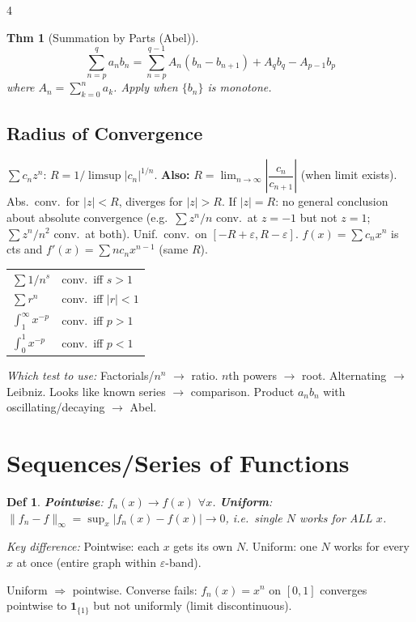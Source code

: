 \documentclass[9pt,landscape]{extarticle}
\newcommand{\eps}{\varepsilon}
\theoremstyle{compact}
\newtheorem*{thm}{Thm}
\theoremstyle{defnstyle}
\newtheorem*{defn}{Def}
\begin{document}
\begin{multicols}{4}
\begin{thm}[Summation by Parts (Abel)]
$$\sum_{n=p}^{q}a_n b_n = \sum_{n=p}^{q-1}A_n(b_n - b_{n+1}) + A_q b_q - A_{p-1}b_p$$
where $A_n = \sum_{k=0}^n a_k$. Apply when $\{b_n\}$ is monotone.
\end{thm}

\subsection{Radius of Convergence}
$\sum c_n z^n$: $R = 1/\limsup|c_n|^{1/n}$. \textbf{Also:} $R = \lim_{n\to\infty}\left|\dfrac{c_n}{c_{n+1}}\right|$ (when limit exists). Abs.\ conv.\ for $|z|<R$, diverges for $|z|>R$. If $|z|=R$: no general conclusion about absolute convergence (e.g.\ $\sum z^n/n$ conv.\ at $z=-1$ but not $z=1$; $\sum z^n/n^2$ conv.\ at both). Unif.\ conv.\ on $[-R+\eps,R-\eps]$. $f(x)=\sum c_n x^n$ is cts and $f'(x) = \sum nc_n x^{n-1}$ (same $R$).

\smallskip
\begin{tabular}{@{}ll@{}}
$\sum 1/n^s$ & conv.\ iff $s > 1$ \\
$\sum r^n$ & conv.\ iff $|r| < 1$ \\
$\int_1^\infty x^{-p}$ & conv.\ iff $p > 1$ \\
$\int_0^1 x^{-p}$ & conv.\ iff $p < 1$ \\
\end{tabular}

\textit{Which test to use:} Factorials/$n^n$ $\to$ ratio. $n$th powers $\to$ root. Alternating $\to$ Leibniz. Looks like known series $\to$ comparison. Product $a_n b_n$ with oscillating/decaying $\to$ Abel.

\section{Sequences/Series of Functions}

\begin{defn}
\textbf{Pointwise}: $f_n(x) \to f(x)$ $\forall x$. \textbf{Uniform}: $\|f_n - f\|_\infty = \sup_x|f_n(x)-f(x)| \to 0$, i.e.\ single $N$ works for ALL $x$.
\end{defn}

\textit{Key difference:} Pointwise: each $x$ gets its own $N$. Uniform: one $N$ works for every $x$ at once (entire graph within $\eps$-band).

Uniform $\Rightarrow$ pointwise. Converse fails: $f_n(x) = x^n$ on $[0,1]$ converges pointwise to $\mathbf{1}_{\{1\}}$ but not uniformly (limit discontinuous).


\end{multicols}
\end{document}

